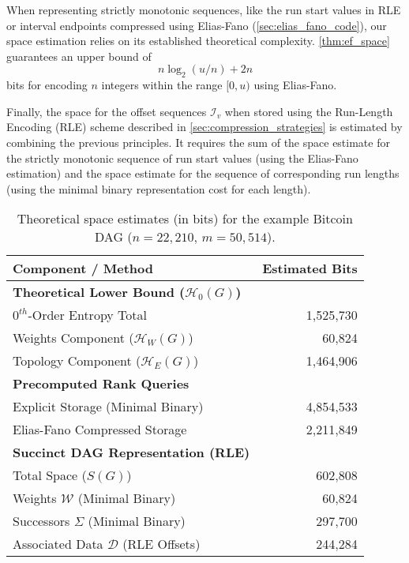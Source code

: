 When representing strictly monotonic sequences, like the run start values in RLE or interval endpoints compressed using Elias-Fano (\autoref{sec:elias_fano_code}), our space estimation relies on its established theoretical complexity. \autoref{thm:ef_space} guarantees an upper bound of
\[n \log_2(u/n) + 2n\]
bits for encoding $n$ integers within the range $[0, u)$ using Elias-Fano.

Finally, the space for the offset sequences $\mathcal{I}_v$ when stored using the Run-Length Encoding (RLE) scheme described in \autoref{sec:compression_strategies} is estimated by combining the previous principles. It requires the sum of the space estimate for the strictly monotonic sequence of run start values (using the Elias-Fano estimation) and the space estimate for the sequence of corresponding run lengths (using the minimal binary representation cost for each length).

\begin{table}[htbp]
    \centering
    \small
    \begin{tabular}{l r}
        \toprule
        Component / Method                                      & Estimated Bits \\
        \midrule
        \textbf{Theoretical Lower Bound ($\mathcal{H}_0(G)$)}   &                \\
        \quad $0^{th}$-Order Entropy Total                      & 1,525,730      \\
        \quad \quad Weights Component ($\mathcal{H}_W(G)$)      & 60,824         \\
        \quad \quad Topology Component ($\mathcal{H}_E(G)$)     & 1,464,906      \\
        \midrule
        \textbf{Precomputed Rank Queries}                       &                \\
        \quad Explicit Storage (Minimal Binary)                 & 4,854,533      \\
        \quad Elias-Fano Compressed Storage                     & 2,211,849      \\
        \midrule
        \textbf{Succinct DAG Representation (RLE)}              &                \\
        \quad Total Space ($S(G)$)                              & 602,808        \\
        \quad \quad Weights $\mathcal{W}$ (Minimal Binary)      & 60,824         \\
        \quad \quad Successors $\Sigma$ (Minimal Binary)        & 297,700        \\
        \quad \quad Associated Data $\mathcal{D}$ (RLE Offsets) & 244,284        \\
        \bottomrule
    \end{tabular}
    \caption{Theoretical space estimates (in bits) for the example Bitcoin DAG ($n=22,210$, $m=50,514$).}
    \label{tab:space_estimates_bitcoin}
\end{table}

